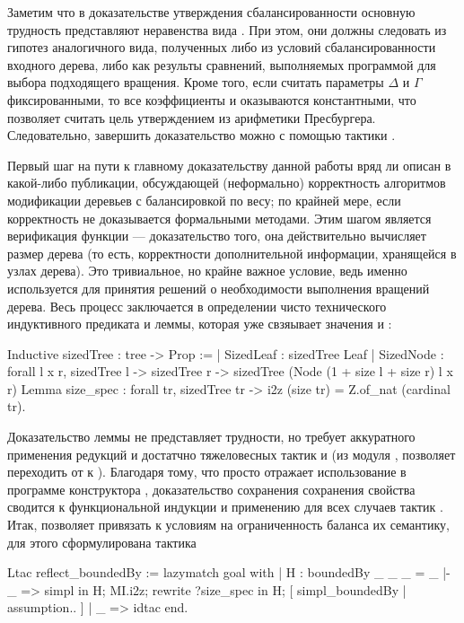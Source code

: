 \documentclass[a4paper,14pt]{extarticle}
\begin{document}
Заметим что в доказательстве утверждения сбалансированности
основную трудность представляют неравенства вида
.
При этом, они должны следовать из гипотез аналогичного вида, полученных
либо из условий сбалансированности входного дерева,
либо как результы сравнений, выполняемых программой
для выбора подходящего вращения.
Кроме того, если считать параметры
\( \Delta \) и \( \Gamma \)
фиксированными, то все коэффициенты  и 
оказываются константными,
что позволяет считать цель утверждением из арифметики Пресбургера.
Следовательно, завершить доказательство можно
с помощью тактики .

Первый шаг на пути к главному доказательству данной работы
вряд ли описан в какой-либо публикации,
обсуждающей (неформально) корректность алгоритмов модификации
деревьев с балансировкой по весу;
по крайней мере, если корректность не доказывается
формальными методами.
Этим шагом является верификация функции  ---
доказательство того, она действительно вычисляет размер дерева
(то есть, корректности дополнительной информации, хранящейся в узлах дерева).
Это тривиальное, но крайне важное условие,
ведь именно  используется для принятия
решений о необходимости выполнения вращений дерева.
Весь процесс заключается в определении
чисто технического индуктивного предиката
и леммы, которая уже свзяывает значения
 и :
\begin{coqcode}
Inductive sizedTree : tree -> Prop :=
  | SizedLeaf : sizedTree Leaf
  | SizedNode : forall l x r,
                sizedTree l ->
                sizedTree r ->
                sizedTree (Node
                  (1 + size l + size r)
                  l x r)
Lemma size_spec : forall tr, sizedTree tr ->
  i2z (size tr) = Z.of_nat (cardinal tr).
\end{coqcode}

Доказательство леммы не представляет трудности,
но требует аккуратного применения редукций
и достатчно тяжеловесных тактик 
и 
(из модуля ,
позволяет переходить от  к ).
Благодаря тому, что  просто
отражает использование в программе конструктора ,
доказательство сохранения сохранения свойства
 сводится к функциональной индукции
и применению для всех случаев тактик .
Итак,  позволяет
привязать к условиям на ограниченность баланса
их семантику, для этого сформулирована тактика
\begin{coqcode}
Ltac reflect_boundedBy := lazymatch goal with
  | H : boundedBy _ _ _ = _ |- _ =>
    simpl in H;
    MI.i2z;
    rewrite ?size_spec in H;
    [ simpl_boundedBy | assumption.. ]
  | _ => idtac
end.
\end{coqcode}
\end{document}

